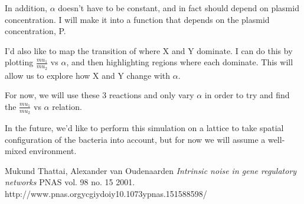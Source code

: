 \documentclass[oneside]{labbook}
\begin{document}
In addition, $\alpha$ doesn't have to be
constant, and in fact should depend on plasmid concentration. I will make it into
a function that depends on the plasmid concentration, P.

I'd also like to map the transition of where X and Y dominate. I can do this by
plotting $\frac{mu_1}{mu_2}$ vs $\alpha$, and then highlighting regions where
each dominate. This will allow us to explore how X and Y change with $\alpha$.

For now, we will use these 3 reactions and only vary $\alpha$ in order to try
and find the $\frac{mu_1}{mu_2}$ vs $\alpha$ relation.

In the future, we'd like to perform this simulation on a lattice to take spatial
configuration of the bacteria into account, but for now we will assume a well-mixed
environment.

\begin{thebibliography}{2}
Mukund Thattai, Alexander van Oudenaarden
\emph{Intrinsic noise in gene regulatory networks}
PNAS vol. 98 no. 15
2001.
http://www.pnas.orgycgiydoiy10.1073ypnas.151588598/
\end{thebibliography}
\end{document}

